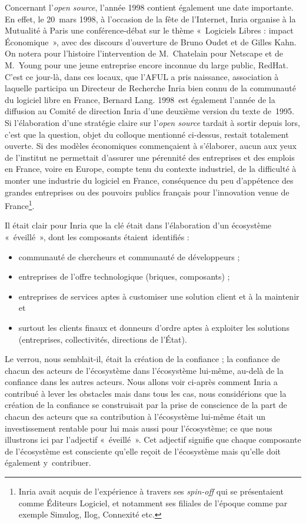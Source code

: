 \documentclass{FramateX}
\begin{document}
\begin{refsection}
Concernant l'\textit{open source}, l'année 1998 contient également une date importante. En effet, le 20~mars 1998, à l'occasion de la fête de
l'Internet, Inria organise à la Mutualité à Paris une conférence-débat
sur le thème «~Logiciels Libres : impact Économique~», avec des
discours d'ouverture de Bruno Oudet et de Gilles Kahn. On notera pour
l'histoire l'intervention de M.~Chatelain pour Netscape et de M.~Young
pour une jeune entreprise encore inconnue du large public, RedHat.
C'est ce jour-là, dans ces locaux, que l'AFUL a pris naissance,
association à laquelle participa un Directeur de Recherche Inria bien
connu de la communauté du logiciel libre en France, Bernard Lang.
1998~est également l'année de la diffusion au Comité de direction Inria
d'une deuxième version du texte de~1995. Si l'élaboration d'une
stratégie claire sur l'\textit{open source} tardait à sortir depuis
lors, c'est que la question, objet du colloque mentionné ci-dessus,
restait totalement ouverte. Si des modèles économiques commençaient à
s'élaborer, aucun aux yeux de l'institut ne permettait d'assurer une
pérennité des entreprises et des emplois en France, voire en Europe,
compte tenu du contexte industriel, de la difficulté à monter une
industrie du logiciel en France, conséquence du peu d'appétence des
grandes entreprises ou des pouvoirs publics français pour l'innovation
venue de France\footnote{Inria avait acquis de
l'expérience à travers ses \textit{spin-off} qui se présentaient comme Éditeurs Logiciel, et notamment ses filiales de
l'époque comme par exemple Simulog, Ilog, Connexité etc.}.

Il était clair pour Inria que la clé était dans l'élaboration d'un
écosystème «~éveillé~», dont les composants étaient~identifiés :

\begin{itemize}
\item communauté de chercheurs et communauté de développeurs ; 
\item entreprises de l'offre technologique (briques, composants) ; 
\item entreprises de services aptes à customiser une solution client et
à la maintenir et 
\item surtout les clients finaux et donneurs d'ordre aptes à exploiter
les solutions (entreprises, collectivités, directions de l'État).
\end{itemize}

Le verrou, nous semblait-il, était la création de la confiance ; la
confiance de chacun des acteurs de l'écosystème dans l'écosystème
lui-même, au-delà de la confiance dans les autres acteurs. Nous allons
voir ci-après comment Inria a contribué à lever les obstacles mais dans
tous les cas, nous considérions que la création de la confiance se
construisait par la prise de conscience de la part de chacun des
acteurs que sa contribution à l'écosystème lui-même était un
investissement rentable pour lui mais aussi pour l'écosystème; ce que
nous illustrons ici par l'adjectif «~éveillé~». Cet adjectif signifie
que chaque composante de l'écosystème est consciente qu'elle reçoit de
l'écosystème mais qu'elle doit également y~contribuer. 


\end{refsection}
\end{document}
